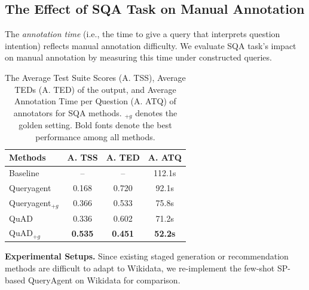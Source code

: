 \documentclass[runningheads]{llncs}
\begin{document}

\subsection{The Effect of SQA Task on Manual Annotation} \label{subsec:human_anno}
The \textit{annotation time} (i.e., the time to give a query that interprets question intention) reflects manual annotation difficulty.
We evaluate SQA task's impact on manual annotation by measuring this time under constructed queries.

\begin{table}[t]
\caption{The Average Test Suite Scores (A. TSS), Average TEDs (A. TED) of the output, and Average Annotation Time per Question (A. ATQ) of annotators for SQA methods. $_{+g}$ denotes the golden setting. Bold fonts denote the best performance among all methods.}
\centering
\setlength{\tabcolsep}{10pt}
\begin{tabular}[ht]{lccc}
     \toprule
    \textbf{Methods}  & \textbf{A. TSS} & \textbf{A. TED} & \textbf{A. ATQ} \\
    \midrule
    Baseline &--& -- &  112.1s \\ 
    Queryagent & 0.168 & 0.720  & 92.1s \\
    Queryagent$_{+g}$  & 0.366 &0.533  & 75.8s\\
    QuAD  & 0.336 & 0.602 & 71.2s \\ 
    QuAD$_{+g}$ & \textbf{0.535} & \textbf{0.451} &  \textbf{52.2s}\\
    \bottomrule    
\end{tabular}
\vspace{-1em}
\label{table:annotation_exps} 
\end{table}

\noindent\textbf{Experimental Setups.}
Since existing staged generation or recommendation methods are difficult to adapt to Wikidata, we re-implement the few-shot SP-based QueryAgent \cite{huang2024queryagent} on Wikidata for comparison.
\end{document}
